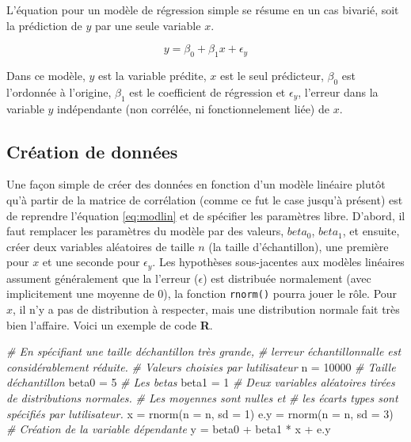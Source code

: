 \documentclass[
]{book}
\newenvironment{Shaded}{}{}
\newcommand{\AttributeTok}[1]{#1}
\newcommand{\CommentTok}[1]{\textit{#1}}
\newcommand{\DecValTok}[1]{#1}
\newcommand{\FunctionTok}[1]{#1}
\newcommand{\NormalTok}[1]{#1}
\newcommand{\OtherTok}[1]{#1}
\newcommand{\SpecialCharTok}[1]{#1}
\begin{document}
L'équation pour un modèle de régression simple se résume en un cas bivarié, soit la prédiction de \(y\) par une seule variable \(x\).

\begin{equation}
y = \beta_0 + \beta_1 x + \epsilon_y
\label{eq:modlin}
\end{equation}

Dans ce modèle, \(y\) est la variable prédite, \(x\) est le seul prédicteur, \(\beta_0\) est l'ordonnée à l'origine, \(\beta_1\) est le coefficient de régression et \(\epsilon_y\), l'erreur dans la variable \(y\) indépendante (non corrélée, ni fonctionnelement liée) de \(x\).

\hypertarget{cruxe9ation-de-donnuxe9es-1}{%
\subsection{Création de données}\label{cruxe9ation-de-donnuxe9es-1}}

Une façon simple de créer des données en fonction d'un modèle linéaire plutôt qu'à partir de la matrice de corrélation (comme ce fut le case jusqu'à présent) est de reprendre l'équation \eqref{eq:modlin} et de spécifier les paramètres libre. D'abord, il faut remplacer les paramètres du modèle par des valeurs, \(beta_0\), \(beta_1\), et ensuite, créer deux variables aléatoires de taille \(n\) (la taille d'échantillon), une première pour \(x\) et une seconde pour \(\epsilon_y\). Les hypothèses sous-jacentes aux modèles linéaires assument généralement que la l'erreur (\(\epsilon\)) est distribuée normalement (avec implicitement une moyenne de 0), la fonction \texttt{rnorm()} pourra jouer le rôle. Pour \(x\), il n'y a pas de distribution à respecter, mais une distribution normale fait très bien l'affaire. Voici un exemple de code \textbf{R}.

\begin{Shaded}
\begin{Highlighting}[]
\CommentTok{\# En spécifiant une taille d\textquotesingle{}échantillon très grande,}
\CommentTok{\# l\textquotesingle{}erreur échantillonnalle est considérablement réduite.}
\CommentTok{\# Valeurs choisies par l\textquotesingle{}utilisateur}
\NormalTok{n }\OtherTok{=} \DecValTok{10000} \CommentTok{\# Taille d\textquotesingle{}échantillon}
\NormalTok{beta0 }\OtherTok{=} \DecValTok{5} \CommentTok{\# Les betas}
\NormalTok{beta1 }\OtherTok{=} \DecValTok{1}
\CommentTok{\# Deux variables aléatoires tirées de distributions normales.}
\CommentTok{\# Les moyennes sont nulles et }
\CommentTok{\# les écarts types sont spécifiés par l\textquotesingle{}utilisateur.}
\NormalTok{x }\OtherTok{=} \FunctionTok{rnorm}\NormalTok{(}\AttributeTok{n =}\NormalTok{ n, }\AttributeTok{sd =} \DecValTok{1}\NormalTok{)}
\NormalTok{e.y }\OtherTok{=} \FunctionTok{rnorm}\NormalTok{(}\AttributeTok{n =}\NormalTok{ n, }\AttributeTok{sd =} \DecValTok{3}\NormalTok{)}
\CommentTok{\# Création de la variable dépendante}
\NormalTok{y }\OtherTok{=}\NormalTok{ beta0 }\SpecialCharTok{+}\NormalTok{ beta1 }\SpecialCharTok{*}\NormalTok{ x }\SpecialCharTok{+}\NormalTok{ e.y}
\end{Highlighting}
\end{Shaded}
\end{document}
